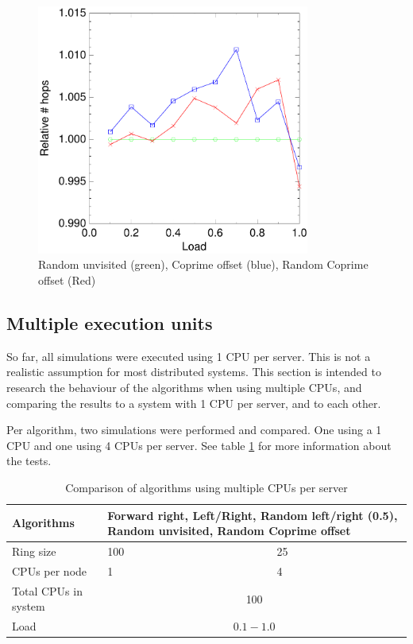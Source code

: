 \documentclass[10pt,a4paper]{article}
\begin{document}
\begin{figure}[h!tb]
\centering
\includegraphics[width=0.8\textwidth]{data/randunvisited_prime_randprime.pdf}
\caption{Random unvisited (green), Coprime offset (blue), Random Coprime offset (Red)}
\label{figrandunvisited}
\end{figure}

\subsection{Multiple execution units}
So far, all simulations were executed using 1 CPU per server. This is not a realistic assumption for most distributed systems. This section is intended to research the behaviour of the algorithms when using multiple CPUs, and comparing the results to a system with 1 CPU per server, and to each other.

Per algorithm, two simulations were performed and compared. One using a 1 CPU and one using 4 CPUs per server. See table \ref{tabcpus} for more information about the tests.

\begin{table}[h!]
\centering
\begin{tabular}{|p{}|p{}|p{}|} \hline
Algorithms & \multicolumn{2}{|p{0.8\textwidth}|}{Forward right, Left/Right, Random left/right (0.5), Random unvisited, Random Coprime offset} \\ \hline
Ring size & 100 & 25 \\ \hline
CPUs per node	& 1 & 4 \\ \hline
Total CPUs in system & \multicolumn{2}{|c|}{100} \\ \hline
Load	& \multicolumn{2}{|c|}{$0.1 - 1.0$} \\ \hline
\end{tabular}
\caption{Comparison of algorithms using multiple CPUs per server}
\label{tabcpus}
\end{table}
\end{document}
